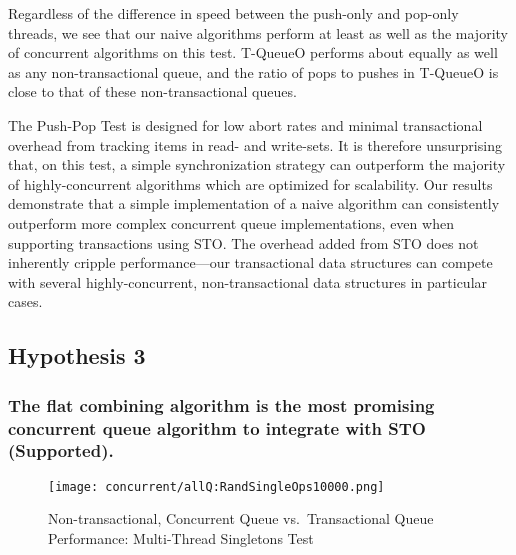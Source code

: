 Regardless of the difference in speed between the push-only and pop-only threads, we see that our naive algorithms perform at least as well as the majority of concurrent algorithms on this test. 
T-QueueO performs about equally as well as any non-transactional queue, and the ratio of pops to pushes in T-QueueO is close to that of these non-transactional queues.

The Push-Pop Test is designed for low abort rates and minimal transactional overhead from tracking items in read- and write-sets. It is therefore unsurprising that, on this test, a simple synchronization strategy can outperform the majority of highly-concurrent algorithms which are optimized for scalability. 
Our results demonstrate that a simple implementation of a naive algorithm can consistently outperform more complex concurrent queue implementations, even when supporting transactions using STO. The overhead added from STO does not inherently cripple performance---our transactional data structures can compete with several highly-concurrent, non-transactional data structures in particular cases. 

\vspace{12pt}
\noindent{}


\subsection{Hypothesis 3}
\subsubsection{The flat combining algorithm is the most promising concurrent queue algorithm to integrate with STO (Supported).}
\label{eval:hypo3}

\begin{figure}[t!]
    \centering
   	\begin{minipage}{\textwidth}
        {\texttt{[image: concurrent/allQ:RandSingleOps10000.png]}}
	\end{minipage}
    \caption{Non-transactional, Concurrent Queue vs.\ Transactional Queue Performance: Multi-Thread Singletons Test}
    \label{fig:ntqs}
\end{figure}


